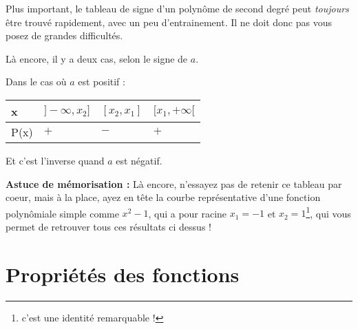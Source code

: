 \documentclass[french,]{article}
\begin{document}
Plus important, le tableau de signe d'un polynôme de second degré peut
\emph{toujours} être trouvé rapidement, avec un peu d'entrainement. Il
ne doit donc pas vous posez de grandes difficultés.

Là encore, il y a deux cas, selon le signe de \(a\).

Dans le cas où \(a\) est positif :

\begin{longtable}[]{@{}llll@{}}
\toprule
\begin{minipage}[b]{0.09\columnwidth}\raggedright
x\strut
\end{minipage} & \begin{minipage}[b]{0.22\columnwidth}\raggedright
\(]-\infty,x_2]\)\strut
\end{minipage} & \begin{minipage}[b]{0.18\columnwidth}\raggedright
\([x_2 ,x_1]\)\strut
\end{minipage} & \begin{minipage}[b]{0.23\columnwidth}\raggedright
\([x_1, +\infty[\)\strut
\end{minipage}\tabularnewline
\midrule
\endhead
\begin{minipage}[t]{0.09\columnwidth}\raggedright
P(x)\strut
\end{minipage} & \begin{minipage}[t]{0.22\columnwidth}\raggedright
\(+\)\strut
\end{minipage} & \begin{minipage}[t]{0.18\columnwidth}\raggedright
\(-\)\strut
\end{minipage} & \begin{minipage}[t]{0.23\columnwidth}\raggedright
\(+\)\strut
\end{minipage}\tabularnewline
\bottomrule
\end{longtable}

Et c'est l'inverse quand \(a\) est négatif.

\textbf{Astuce de mémorisation :} Là encore, n'essayez pas de retenir ce
tableau par coeur, mais à la place, ayez en tête la courbe
représentative d'une fonction polynômiale simple comme \(x^2 -1\), qui a
pour racine \(x_1 = -1\) et \(x_2 =1\)\footnote{c'est une identité
  remarquable !}, qui vous permet de retrouver tous ces résultats ci
dessus !

\hypertarget{propriuxe9tuxe9s-des-fonctions}{%
\section{Propriétés des
fonctions}\label{propriuxe9tuxe9s-des-fonctions}}
\end{document}
